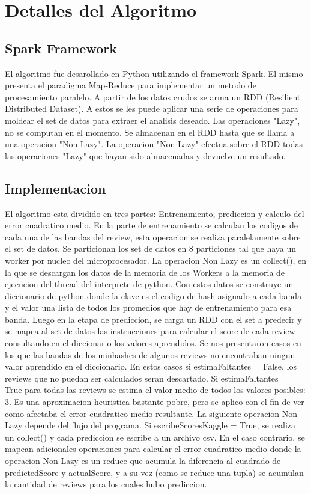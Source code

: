 \documentclass[a4paper,10pt]{article}
\begin{document}
	\section{Detalles del Algoritmo}
	
	\subsection{Spark Framework}
	El algoritmo fue desarollado en Python utilizando el framework Spark. El mismo presenta el paradigma Map-Reduce para implementar un metodo de procesamiento paralelo. A partir de los datos crudos se arma un RDD (Resilient Distributed Dataset). A estos se les puede aplicar una serie de operaciones para moldear el set de datos para extraer el analisis deseado. Las operaciones "Lazy", no se computan en el momento. Se almacenan en el RDD hasta que se llama a una operacion "Non Lazy". La operacion "Non Lazy" efectua sobre el RDD todas las operaciones "Lazy" que hayan sido almacenadas y devuelve un resultado.
	
	\subsection{Implementacion}
	El algoritmo esta dividido en tres partes: Entrenamiento, prediccion y calculo del error cuadratico medio. 
	En la parte de entrenamiento se calculan los codigos de cada una de las bandas del review, esta operacion se realiza paralelamente sobre el set de datos. Se particionan los set de datos en 8 particiones tal que haya un worker por nucleo del microprocesador. La operacion Non Lazy es un collect(), en la que se descargan los datos de la memoria de los Workers a la memoria de ejecucion del thread del interprete de python. Con estos datos se construye un diccionario de python donde la clave es el codigo de hash asignado a cada banda y el valor una lista de todos los promedios que hay de entrenamiento para esa banda. Luego en la etapa de prediccion, se carga un RDD con el set a predecir y se mapea al set de datos las instrucciones para calcular el score de cada review consultando en el diccionario los valores aprendidos. Se nos presentaron casos en los que las bandas de los minhashes de algunos reviews no encontraban ningun valor aprendido en el diccionario. En estos casos si estimaFaltantes = False, los reviews que no puedan ser calculados seran descartado. Si estimaFaltantes = True para todas las reviews se estima el valor medio de todos los valores posibles: 3. Es una aproximacion heuristica bastante pobre, pero se aplico con el fin de ver como afectaba el error cuadratico medio resultante.  La siguiente operacion Non Lazy depende del flujo del programa. Si escribeScoresKaggle = True, se realiza un collect() y cada prediccion se escribe a un archivo csv. En el caso contrario, se mapean adicionales operaciones para calcular el error cuadratico medio donde la operacion Non Lazy es un reduce que acumula la diferencia al cuadrado de predictedScore y actualScore, y a su vez (como se reduce una tupla) se acumulan la cantidad de reviews para los cuales hubo prediccion.
		
\end{document}
